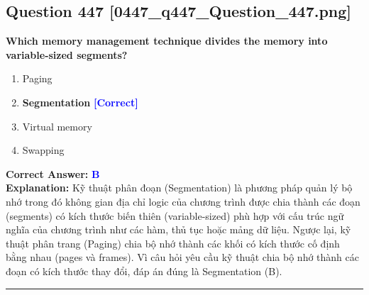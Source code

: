 \documentclass[11pt,a4paper]{article}
\begin{document}
\begin{minipage}{\textwidth}
\subsection*{Question 447 \quad \footnotesize{[0447\_q447\_Question\_447.png]}}
\noindent \textbf{Which memory management technique divides the memory into variable-sized segments?}

\begin{enumerate}[label=\Alph*.]
    \item Paging
    \item \textbf{Segmentation} \hfill \textcolor{blue}{\textbf{[Correct]}}
    \item Virtual memory
    \item Swapping
\end{enumerate}

\noindent \textbf{Correct Answer:} \textcolor{blue}{\textbf{B}} \\[2pt]
\noindent \textbf{Explanation:} Kỹ thuật phân đoạn (Segmentation) là phương pháp quản lý bộ nhớ trong đó không gian địa chỉ logic của chương trình được chia thành các đoạn (segments) có kích thước biến thiên (variable-sized) phù hợp với cấu trúc ngữ nghĩa của chương trình như các hàm, thủ tục hoặc mảng dữ liệu. Ngược lại, kỹ thuật phân trang (Paging) chia bộ nhớ thành các khối có kích thước cố định bằng nhau (pages và frames). Vì câu hỏi yêu cầu kỹ thuật chia bộ nhớ thành các đoạn có kích thước thay đổi, đáp án đúng là Segmentation (B).

\par\vspace{0.3cm}
\hrule
\vspace{0.3cm}
\end{minipage}
\end{document}
